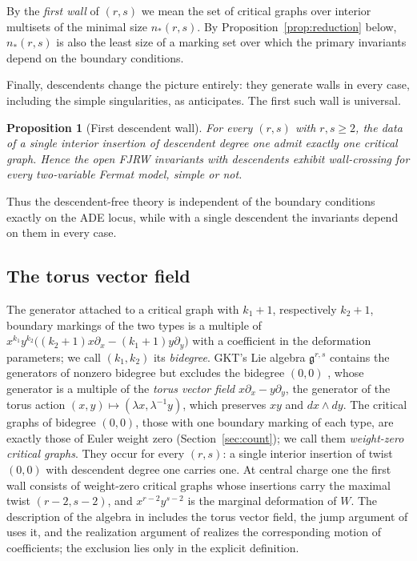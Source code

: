 \documentclass[11pt]{amsart}
\newtheorem{proposition}[theorem]{Proposition}
\theoremstyle{definition}
\theoremstyle{remark}
\newcommand{\gfrak}{\mathfrak{g}}
\begin{document}
By the \emph{first wall} of $(r,s)$ we mean the set of critical graphs over
interior multisets of the minimal size $n_{*}(r,s)$.  By
Proposition~\ref{prop:reduction} below, $n_*(r,s)$ is also the least size of a
marking set over which the primary invariants depend on the boundary
conditions.

Finally, descendents change the picture entirely: they generate walls in every
case, including the simple singularities, as \cite[Remark~0.9]{GKT} anticipates.
The first such wall is universal.

\begin{proposition}[First descendent wall]
\label{prop:descendent}
For every $(r,s)$ with $r,s\geq2$, the data of a single interior insertion of
descendent degree one admit exactly one critical graph. Hence the open FJRW invariants with descendents
exhibit wall-crossing for every two-variable Fermat model, simple or not.
\end{proposition}

Thus the descendent-free theory is independent of the boundary conditions
exactly on the ADE locus, while with a single descendent the invariants
depend on them in every case.

\subsection*{The torus vector field}
The generator attached to a critical graph with $k_1+1$, respectively $k_2+1$,
boundary markings of the two types is a multiple of
$x^{k_1}y^{k_2}\bigl((k_2+1)x\partial_x-(k_1+1)y\partial_y\bigr)$ with a
coefficient in the deformation parameters; we call $(k_1,k_2)$ its
\emph{bidegree}.  GKT's Lie algebra $\gfrak^{r,s}$ contains the generators of
nonzero bidegree but excludes the bidegree $(0,0)$ \cite[Def.~4.23]{GKT},
whose generator is a multiple of the \emph{torus vector field}
$x\partial_x-y\partial_y$, the generator of the torus action
$(x,y)\mapsto(\lambda x,\lambda^{-1}y)$, which preserves $xy$ and
$dx\wedge dy$.  The critical graphs of bidegree $(0,0)$, those with one
boundary marking of each type, are exactly those of Euler weight zero
(Section~\ref{sec:count}); we call them \emph{weight-zero critical graphs}.
They occur for every $(r,s)$: a single interior insertion of twist $(0,0)$
with descendent degree one carries one.  At central charge one the first wall
consists of weight-zero critical graphs whose insertions carry the maximal
twist $(r-2,s-2)$, and $x^{r-2}y^{s-2}$ is the marginal deformation of $W$.
The description of the algebra in \cite[\S0.4 and Remark~4.24]{GKT} includes
the torus vector field, the jump argument of \cite[Theorem~5.9]{GKT} uses it,
and the realization argument of \cite[Theorem~5.13]{GKT} realizes the
corresponding motion of coefficients; the exclusion lies only in the explicit
definition.
\end{document}
